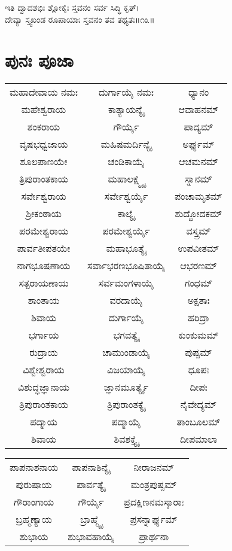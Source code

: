 ಇತಿ ದ್ವಾದಶಭಿಃ ಶ್ಲೋಕೈಃ ಸ್ತವನಂ ಸರ್ವ ಸಿದ್ಧಿ ಕೃತ್।\\
ದೇವ್ಯಾ ಸ್ತ್ವಖಂಡ ರೂಪಾಯಾಃ ಸ್ತವನಂ ತವ ತಥ್ಯತಃ॥೧೩॥
\newpage\section{ಪುನಃ ಪೂಜಾ}
\begin{tabular}{ c c c }
ಮಹಾದೇವಾಯ ನಮಃ & ದುರ್ಗಾಯೈ  ನಮಃ & ಧ್ಯಾನಂ\\
ಮಹೇಶ್ವರಾಯ & ಕಾತ್ಯಾಯನ್ಯೈ & ಆವಾಹನಮ್\\
ಶಂಕರಾಯ & ಗೌರ್ಯೈ & ಪಾದ್ಯಮ್\\
ವೃಷಭಧ್ವಜಾಯ & ಮಹಿಷಮರ್ದಿನ್ಯೈ & ಅರ್ಘ್ಯಮ್\\
ಶೂಲಪಾಣಯೇ & ಚಂಡಿಕಾಯೈ & ಆಚಮನಮ್\\
ತ್ರಿಪುರಾಂತಕಾಯ & ಮಹಾಲಕ್ಷ್ಮ್ಯೈ & ಸ್ನಾನಮ್\\
ಸರ್ವೇಶ್ವರಾಯ & ಸರ್ವೇಶ್ವರ್ಯೈ & ಪಂಚಾಮೃತಮ್\\
ಶ್ರೀಕಂಠಾಯ & ಕಾಲ್ಯೈ & ಶುದ್ಧೋದಕಮ್\\
ಪರಮೇಶ್ವರಾಯ & ಪರಮೇಶ್ವರ್ಯೈ & ವಸ್ತ್ರಮ್\\
ಪಾರ್ವತೀಪತಯೇ & ಮಹಾಭೂತ್ಯೈ & ಉಪವೀತಮ್\\
ನಾಗಭೂಷಣಾಯ & ಸರ್ವಾಭರಣಭೂಷಿತಾಯೈ & ಆಭರಣಮ್\\
ಸತ್ಪರಾಯಣಾಯ & ಸರ್ವಮಂಗಳಾಯೈ & ಗಂಧಮ್\\
ಶಾಂತಾಯ & ವರದಾಯೈ & ಅಕ್ಷತಾಃ\\
ಶಿವಾಯ & ದುರ್ಗಾಯೈ & ಹರಿದ್ರಾ\\
ಭರ್ಗಾಯ & ಭಗವತ್ಯೈ & ಕುಂಕುಮಮ್\\
ರುದ್ರಾಯ & ಚಾಮುಂಡಾಯೈ & ಪುಷ್ಪಮ್\\
ವಿಶ್ವೇಶ್ವರಾಯ & ವಿಜಯಾಯೈ & ಧೂಪಃ\\
ವಿಶುದ್ಧಜ್ಞಾನಾಯ & ಜ್ಞಾನಮೂರ್ತ್ಯೈ & ದೀಪಃ\\
ತ್ರಿಪುರಾಂತಕಾಯ & ತ್ರಿಪುರಾಂತಕ್ಯೈ & ನೈವೇದ್ಯಮ್\\
ಪದ್ಮಾಯ & ಪದ್ಮಾಯೈ & ತಾಂಬೂಲಮ್\\
ಶಿವಾಯ & ಶಿವಶಕ್ತ್ಯೈ & ದೀಪಮಾಲಾ\\
\end{tabular}
\newpage
\begin{tabular}{ c c c }
ಪಾಪನಾಶನಾಯ & ಪಾಪನಾಶಿನ್ಯೈ & ನೀರಾಜನಮ್\\
ಪುರುಷಾಯ & ಪಾರ್ವತ್ಯೈ & ಮಂತ್ರಪುಷ್ಪಮ್\\
ಗೌರಾಂಗಾಯ & ಗೌರ್ಯೈ & ಪ್ರದಕ್ಷಿಣನಮಸ್ಕಾರಾಃ\\
ಬ್ರಹ್ಮಣ್ಯಾಯ & ಬ್ರಾಹ್ಮ್ಯೈ & ಪ್ರಸನ್ನಾರ್ಘ್ಯಮ್\\
ಶುಭಾಯ & ಶುಭಾವಹಾಯೈ & ಪ್ರಾರ್ಥನಾ\\
\end{tabular}


